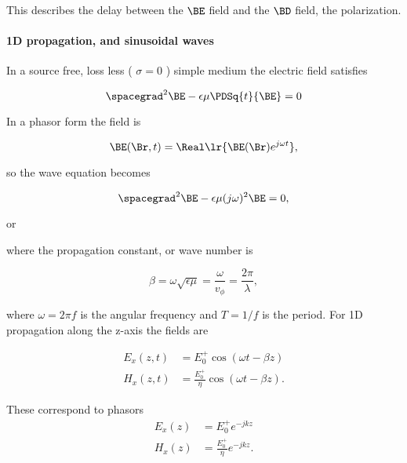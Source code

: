 This describes the delay between the \( \BE \) field and the \( \BD \) field, the polarization.

\paragraph{1D propagation, and sinusoidal waves}

In a source free, loss less ( \( \sigma = 0 \) ) simple medium the electric field satisfies

\begin{equation}\label{eqn:uwavesLecture2:900}
\spacegrad^2 \BE - \epsilon \mu \PDSq{t}{\BE} = 0 
\end{equation}

In a phasor form the field is

\begin{equation}\label{eqn:uwavesLecture2:920}
\BE(\Br, t) = \Real\lr{ \BE(\Br) e^{j \omega t} }, 
\end{equation}

so the wave equation becomes

\begin{equation}\label{eqn:uwavesLecture2:940}
\spacegrad^2 \BE - \epsilon \mu (j\omega)^2 \BE = 0,
\end{equation}

or

where the propagation constant, or wave number is

\begin{equation}\label{eqn:uwavesLecture2:980}
\beta = \omega \sqrt{\epsilon \mu} = \frac{\omega}{v_\phi} = \frac{2 \pi}{\lambda},
\end{equation}

where \( \omega = 2 \pi f \) is the angular frequency and \( T = 1/f \) is the period.  For 1D propagation along the z-axis the fields are

\begin{equation}\label{eqn:uwavesLecture2:1000}
\begin{aligned}
E_x(z, t) &= E_0^{+} \cos(\omega t - \beta z) \\
H_x(z, t) &= \frac{E_0^{+}}{\eta} \cos(\omega t - \beta z).
\end{aligned}
\end{equation}

These correspond to phasors
\begin{equation}\label{eqn:uwavesLecture2:1020}
\begin{aligned}
E_x(z) &= E_0^{+} e^{-j k z } \\
H_x(z) &= \frac{E_0^{+}}{\eta} e^{-j k z }.
\end{aligned}
\end{equation}

